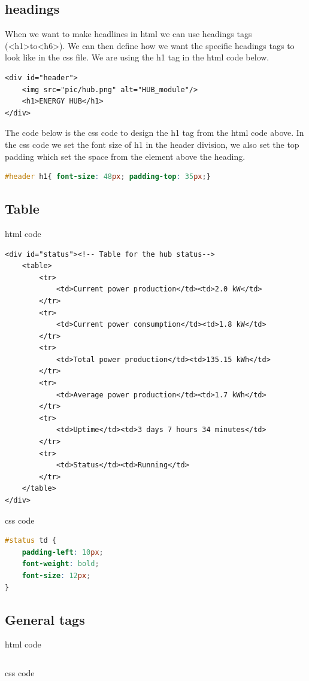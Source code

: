 \subsection{headings}
When we want to make headlines in html we can use headings tags (\textless h1\textgreater  to\textless h6\textgreater). We can then define how we want the specific headings tags to look like in the css file. We are using the h1 tag in the html code below.
\begin{lstlisting}
<div id="header">
	<img src="pic/hub.png" alt="HUB_module"/>
	<h1>ENERGY HUB</h1>
</div>
\end{lstlisting}
The code below is the css code to design the h1 tag from the html code above. In the css code we set the font size of h1 in the header division, we also set the top padding which set the space from the element above the heading.
\begin{lstlisting}[language=CSS]
#header h1{ font-size: 48px; padding-top: 35px;}
\end{lstlisting}

\subsection{Table}
html code
\begin{lstlisting}
<div id="status"><!-- Table for the hub status-->
	<table>
		<tr>
			<td>Current power production</td><td>2.0 kW</td>
		</tr>
		<tr>
			<td>Current power consumption</td><td>1.8 kW</td>
		</tr>
		<tr>
			<td>Total power production</td><td>135.15 kWh</td>
		</tr>
		<tr>
			<td>Average power production</td><td>1.7 kWh</td>
		</tr>
		<tr>
			<td>Uptime</td><td>3 days 7 hours 34 minutes</td>
		</tr>
		<tr>
			<td>Status</td><td>Running</td>
		</tr>
	</table>
</div>
\end{lstlisting}
css code
\begin{lstlisting}[language=CSS]
#status td {
	padding-left: 10px;
	font-weight: bold;
	font-size: 12px;
}
\end{lstlisting}

\subsection{General tags}
html code
\begin{lstlisting}

\end{lstlisting}
css code
\begin{lstlisting}[language=CSS]

\end{lstlisting}